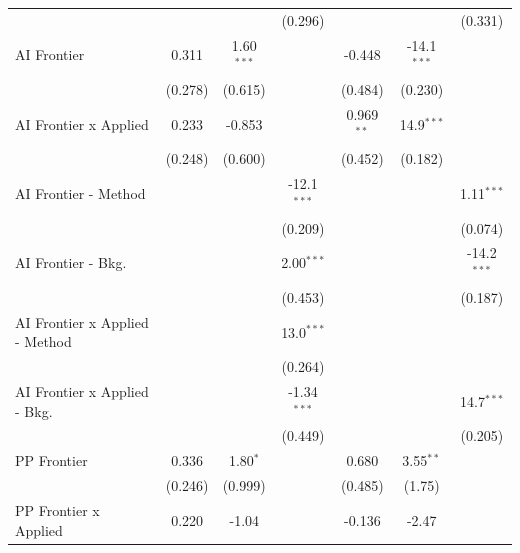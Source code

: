 \begin{tabular}{lcccccc}
                                  &               &               & (0.296)       &               &               & (0.331)\\   
   AI Frontier                    & 0.311         & 1.60$^{***}$  &               & -0.448        & -14.1$^{***}$ &   \\   
                                  & (0.278)       & (0.615)       &               & (0.484)       & (0.230)       &   \\   
   AI Frontier x Applied          & 0.233         & -0.853        &               & 0.969$^{**}$  & 14.9$^{***}$  &   \\   
                                  & (0.248)       & (0.600)       &               & (0.452)       & (0.182)       &   \\   
   AI Frontier - Method           &               &               & -12.1$^{***}$ &               &               & 1.11$^{***}$\\   
                                  &               &               & (0.209)       &               &               & (0.074)\\   
   AI Frontier - Bkg.             &               &               & 2.00$^{***}$  &               &               & -14.2$^{***}$\\   
                                  &               &               & (0.453)       &               &               & (0.187)\\   
   AI Frontier x Applied - Method &               &               & 13.0$^{***}$  &               &               &   \\   
                                  &               &               & (0.264)       &               &               &   \\   
   AI Frontier x Applied - Bkg.   &               &               & -1.34$^{***}$ &               &               & 14.7$^{***}$\\   
                                  &               &               & (0.449)       &               &               & (0.205)\\   
   PP Frontier                    & 0.336         & 1.80$^{*}$    &               & 0.680         & 3.55$^{**}$   &   \\   
                                  & (0.246)       & (0.999)       &               & (0.485)       & (1.75)        &   \\   
   PP Frontier x Applied          & 0.220         & -1.04         &               & -0.136        & -2.47         &   \\   

\end{tabular}
